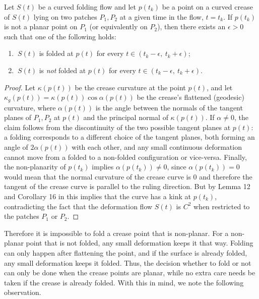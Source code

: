 \begin{theorem}\label{Thm:curved_folding_open_condition}
Let $S(t)$ be a curved folding flow and let $p(t_k)$ be a point on a curved crease of $S(t)$ lying on two patches $P_1,P_2$ at a given time in the flow, $t=t_k$. If $p(t_k)$ is not a planar point on $P_1$ (or equivalently on $P_2$), then there exists an $\epsilon > 0$ such that one of the following holds:
\begin{enumerate}
	\item $\ S(t)$ is folded at $p(t)$ for every $t \in (t_k-\epsilon, \ t_k+\epsilon)$;
	\item $\ S(t)$ is \emph{not} folded at $p(t)$ for every $t \in (t_k-\epsilon, \ t_k+\epsilon)$.
\end{enumerate}
\end{theorem}
\begin{proof}
Let $\kappa(p(t))$ be the crease curvature at the point $p(t)$, and let $\kappa_g(p(t)) = \kappa(p(t))\cos\alpha(p(t))$ be the crease's flattened (geodesic) curvature, where $\alpha(p(t))$ is the angle between the normals of the tangent planes of $P_1,P_2$ at $p(t)$ and the principal normal of $\kappa(p(t))$. If $\alpha \neq 0$, the claim follows from the discontinuity of the two possible tangent planes at $p(t)$: a folding corresponds to a different choice of the tangent planes, both forming an angle of $2\alpha(p(t))$ with each other, and any small continuous deformation cannot move from a folded to a non-folded configuration or vice-versa. Finally, the non-planarity of $p(t_k)$ implies $\alpha(p(t_k)) \neq 0$, since $\alpha(p(t_k)) = 0$ would mean that the normal curvature of the crease curve is $0$ and therefore the tangent of the crease curve is parallel to the ruling direction.
But by Lemma 12 and Corollary 16 in \cite{demaine_lens} this implies that the curve has a kink at  $p(t_k)$, contradicting the fact that the deformation flow $S(t)$ is $C^2$ when restricted to the patches $P_1$ or $P_2$.
\end{proof}

Therefore it is impossible to fold a crease point that is non-planar. For a non-planar point that is not folded, any small deformation keeps it that way. Folding can only happen after flattening the point, and if the surface is already folded, any small deformation keeps it folded. Thus, the decision whether to fold or not can only be done when the crease points are planar, while no extra care needs be taken if the crease is already folded. With this in mind, we note the following observation.

